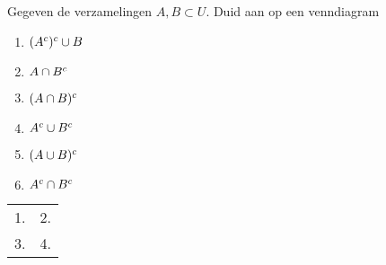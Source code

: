 \begin{oef}
Gegeven de verzamelingen $A,B\subset U$. Duid aan op een venndiagram
\begin{enumerate}
  \item $(A^c)^c \cup B$
  \item $A\cap  B^c$
  \item $(A\cap B)^c$
  \item $A^c \cup  B^c$
  \item $(A\cup B)^c$
  \item $A^c \cap B^c$
\end{enumerate}

\begin{opl}
{
\def\labels{
  \node[anchor=south east] at (-1.55,.6) {$A$};
  \node[anchor=south west] at (1.55,.6) {$B$};
}
\def\universe{(-2.5,-1.5) rectangle +(5,3)}
\def\ellA{(-.9,0) ellipse (1.25cm and 0.75cm)}
\def\ellB{(.9,0) ellipse (1.25cm and 0.75cm)}

\begin{center}
\begin{tabular}{cc}
  1.
  \begin{tikzpicture}
    \draw[thick] \universe;
    \draw[highlight] \ellA;
    \draw[highlight] \ellB;
    \draw[outline] \ellA;
    \labels
  \end{tikzpicture}
  &
  2.
  \begin{tikzpicture}
    \draw[thick] \universe;
    \draw[highlight] \ellA;
    \draw[empty] \ellB;
    \draw[outline] \ellA;
    \labels
  \end{tikzpicture}
  \\
  3.
  \begin{tikzpicture}
    \draw[thick,highlight] \universe;
    \begin{scope}
      \clip \ellA;
      \clip \ellB;
      \draw[empty] \ellA;
    \end{scope}

    \draw[outline] \ellA;
    \draw[outline] \ellB;
    \labels
  \end{tikzpicture}
  &
  4.
  \begin{tikzpicture}
    \draw[thick,highlight] \universe;
    \begin{scope}
      \clip \ellA;
      \clip \ellB;
      \draw[empty] \ellA;
    \end{scope}


\end{tikzpicture}
\end{tabular}
\end{center}}
\end{opl}
\end{oef}
